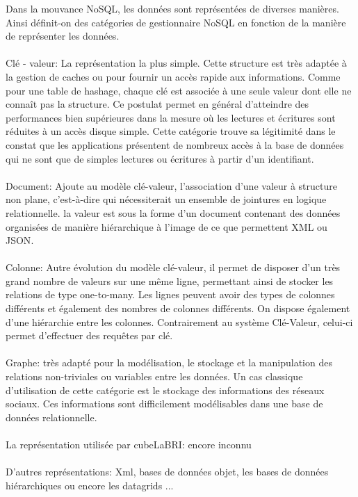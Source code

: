 Dans la mouvance \textsf{NoSQL}, les données sont représentées de
diverses manières. Ainsi définit-on des catégories de gestionnaire
\textsf{NoSQL} en fonction de la manière de représenter les données.
\\\\ \textsf{Clé - valeur}: La
représentation la plus simple. Cette structure est très adaptée à la
gestion de caches ou pour fournir un accès rapide aux
informations. Comme pour une table de hashage, chaque clé est associée
à une seule valeur dont elle ne connaît pas la structure. Ce postulat
permet en général d’atteindre des performances bien supérieures dans
la mesure où les lectures et écritures sont réduites à un accès disque
simple. Cette catégorie trouve sa légitimité dans le constat que les
applications présentent de nombreux accès à la base de données qui ne
sont que de simples lectures ou écritures à partir d’un
identifiant\cite{cleValeur}.  \\\\ {\sf Document}:
Ajoute au modèle clé-valeur,
l’association d’une valeur à structure non plane, c’est-à-dire qui
nécessiterait un ensemble de jointures en logique relationnelle.  la
valeur est sous la forme d'un document contenant des données
organisées de manière hiérarchique à l’image de ce que permettent
\textsf{XML} ou \textsf{JSON}.  \\\\ {\sf Colonne}: Autre évolution du modèle clé-valeur, il permet de
disposer d'un très grand nombre de valeurs sur une même ligne,
permettant ainsi de stocker les relations de type one-to-many. Les
lignes peuvent avoir des types de colonnes différents et également des
nombres de colonnes différents. On dispose également d'une hiérarchie
entre les colonnes. Contrairement au système Clé-Valeur, celui-ci
permet d’effectuer des requêtes par clé.  \\\\ {\sf
  Graphe}: très adapté pour la modélisation, le
stockage et la manipulation des relations non-triviales ou variables
entre les données. Un cas classique d'utilisation de cette catégorie
est le stockage des informations des réseaux sociaux. Ces informations
sont difficilement modélisables dans une base de données
relationnelle.  \\ \\ {\color{red} {\sf La représentation utilisée par
    cubeLaBRI}: encore inconnu} \\ \\ \textsf{D'autres
  représentations}: \textsf{Xml}, \textsf{bases de données objet},
\textsf{les bases de données hiérarchiques ou encore les datagrids}
...

